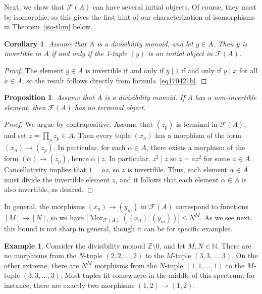 \documentclass[reqno]{amsart}
\theoremstyle{plain}
\newtheorem{cor}[lem]{Corollary}
\newtheorem{prop}[lem]{Proposition}
\theoremstyle{definition}
\newtheorem{ex}[lem]{Example}
\newcommand{\cat}[1]{\mathcal{#1}}
\newcommand{\catf}{\cat{F}}
\newcommand{\bbz}{\mathbb{Z}}
\newcommand{\bbn}{\mathbb{N}}
\renewcommand{\leq}{\leqslant}
\newcommand{\mor}[3]{\operatorname{Mor}_{#1}(#2,#3)}
\numberwithin{equation}{lem}
\begin{document}
Next, we 
show
that $\catf(A)$ can have several initial objects.
Of course, they must be isomorphic, so this gives the first hint of our characterization of isomorphisms
in Theorem~\ref{iso-thm} 
below.

\begin{cor}\label{initial_object_thm}
Assume that $A$ is a divisibility monoid,
and let $y\in A$. Then $y$ is invertible in $A$ if and only if 
the 1-tuple $(y)$ is an initial object in $\mathcal{F}(A)$.
\end{cor}

\begin{proof}
The element $y \in A$ is invertible if and only if $y\mid 1$ if and only if $y \mid x$ for all $x \in A$, so the result follows directly from 
formula~\eqref{eq170421b}.
\end{proof}

\begin{prop}
Assume that $A$ is a divisibility monoid.
If $A$ has a non-invertible element, then
$\mathcal{F}(A)$ has no terminal object.
\end{prop}

\begin{proof}
We argue by contrapositive. Assume
that $(z_p)$ is
terminal in $\catf(A)$, and set $z = \prod_p z_p \in A$.
Then every tuple $(x_n)$ has 
a
morphism of the form $(x_n) \to (z_p)$. 
In particular, for each $\alpha \in A$, there exists a morphism of the form $(\alpha) \to (z_p)$,
hence $\alpha \mid z$. 
In particular, $z^2 \mid z$ so $z = az^2$ for some $a\in A$. Cancellativity implies that $1 = az$, so $z$ is invertible. 
Thus, each element 
$\alpha\in A$
must divide the invertible element $z$, and it follows that each element  
$\alpha\in A$
is also invertible, 
as desired.
\end{proof}

In general, 
the morphisms $(x_n)\to(y_m)$ in $\catf(A)$
correspond to functions $[M]\to[N]$,
so we have $|\mor{\catf(A)}{(x_n)}{(y_m)}|\leq N^M$.
As we see next, this bound is not sharp in general, though it can be
for specific examples.

\begin{ex}\label{ex170421b}
Consider the divisibility monoid $\bbz\setminus 0$, and let $M,N\in\bbn$.
There are no morphisms from the $N$-tuple $(2,2,\ldots,2)$ to the $M$-tuple $(3,3,\ldots,3)$. 
On the other extreme, there are $N^M$ morphisms from the $N$-tuple $(1,1,\ldots,1)$ to the $M$-tuple $(3,3,\ldots,3)$. 
Most tuples fit somewhere in the middle of this spectrum; for instance, there are exactly two morphisms $(1,2)\to(1,2)$.
\end{ex}
\end{document}
